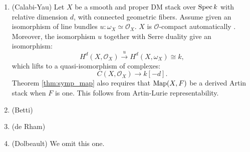 \begin{eg}
\begin{enumerate}
\item (Calabi-Yau) Let $X$ be a smooth and proper DM stack over $\operatorname{Spec} k$ with relative dimension $d$, with connected
geometric fibers. Assume given an isomorphism of line bundles $u:\omega_X \simeq \mathcal{O}_X$. $X$ is $\mathcal{O}$-compact
automatically . Moreover, the isomorphism $u$ together with Serre duality give an isomorphism:
\[	H^d(X,\mathcal{O}_X) \overset{u}{\to} H^d(X,\omega_X) \cong k ,	\]
which lifts to a quasi-isomorphism of complexes:
\[	C(X,\mathcal{O}_X) \to k[-d] .	\]
Theorem \ref{thm:symp_map} also requires that $\operatorname{Map}(X,F)$ be a derived Artin stack when $F$ is one. This follows from 
Artin-Lurie representability.
\item (Betti) 
\item (de Rham)
\item (Dolbeault) We omit this one.
\end{enumerate}
\end{eg}

